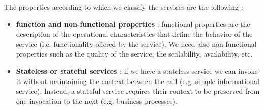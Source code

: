 The properties according to which we classify the services are the following :
\begin{itemize}
    \item \textbf{function and non-functional properties} : functional properties are the description of the operational characteristics that define the behavior of the service (i.e. functionality offered by the service). We need also non-functional properties such as the quality of the service, the scalability, availability, etc.
    \item \textbf{Stateless or stateful services} : if we have a stateless service we can invoke it without maintaining the context between the call (e.g. simple informational service). Instead, a stateful service requires their context to be preserved from one invocation to the next (e.g. business processes).
\end{itemize}
